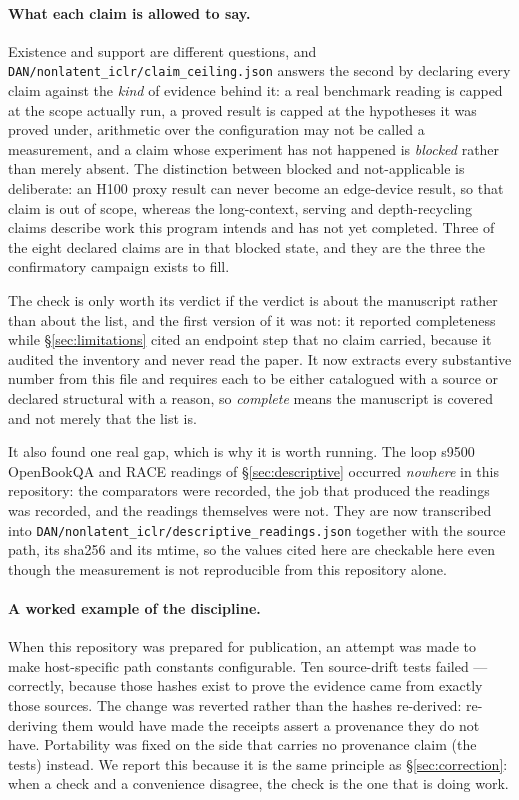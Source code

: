 \documentclass[11pt]{article}
\begin{document}
\paragraph{What each claim is allowed to say.} Existence and support are different
questions, and \texttt{DAN/nonlatent\_iclr/claim\_ceiling.json} answers the second by
declaring every claim against the \emph{kind} of evidence behind it: a real benchmark
reading is capped at the scope actually run, a proved result is capped at the hypotheses
it was proved under, arithmetic over the configuration may not be called a measurement,
and a claim whose experiment has not happened is \emph{blocked} rather than merely
absent. The distinction between blocked and not-applicable is deliberate: an H100 proxy
result can never become an edge-device result, so that claim is out of scope, whereas the
long-context, serving and depth-recycling claims describe work this program intends and
has not yet completed. Three of the eight declared claims are in that blocked state, and
they are the three the confirmatory campaign exists to fill.

The check is only worth its verdict if the verdict is about the manuscript rather than
about the list, and the first version of it was not: it reported completeness while
\S\ref{sec:limitations} cited an endpoint step that no claim carried, because it
audited the inventory and never read the paper. It now extracts every substantive
number from this file and requires each to be either catalogued with a source or
declared structural with a reason, so \emph{complete} means the manuscript is covered
and not merely that the list is.

It also found one real gap, which is why it is worth running. The loop s9500 OpenBookQA
and RACE readings of \S\ref{sec:descriptive} occurred \emph{nowhere} in this repository:
the comparators were recorded, the job that produced the readings was recorded, and the
readings themselves were not. They are now transcribed into
\texttt{DAN/nonlatent\_iclr/descriptive\_readings.json} together with the source path, its
sha256 and its mtime, so the values cited here are checkable here even though the
measurement is not reproducible from this repository alone.

\paragraph{A worked example of the discipline.} When this repository was prepared for
publication, an attempt was made to make host-specific path constants configurable. Ten
source-drift tests failed --- correctly, because those hashes exist to prove the evidence
came from exactly those sources. The change was reverted rather than the hashes
re-derived: re-deriving them would have made the receipts assert a provenance they do not
have. Portability was fixed on the side that carries no provenance claim (the tests)
instead. We report this because it is the same principle as \S\ref{sec:correction}: when
a check and a convenience disagree, the check is the one that is doing work.
\end{document}
